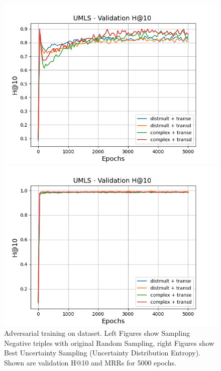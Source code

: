 \begin{figure}
\begin{minipage}{.5\textwidth}
    \end{minipage}
    \begin{minipage}{.5\textwidth}
      \centering
      \includegraphics[width=0.9\linewidth]{figures/results/gan_train/not_pretrained/random/umls/gan_train_random_umls_hit10s.png}
    \end{minipage}%
    \begin{minipage}{.5\textwidth}
      \centering
      \includegraphics[width=0.9\linewidth]{figures/results/gan_train/not_pretrained/uncertainty/max_distribution/entropy/umls/gan_train_uncertainty_umls_hit10s.png}
    \end{minipage}%
    \caption{Adversarial training on \umls dataset. 
    Left Figures show Sampling Negative triples with original Random Sampling, right Figures show Best Uncertainty Sampling (Uncertainty Distribution Entropy).
    Shown are validation H@10 and MRRs for 5000 epochs.}
    \label{fig:advtrain_umls_random_vs_uncertainty}
\end{figure}